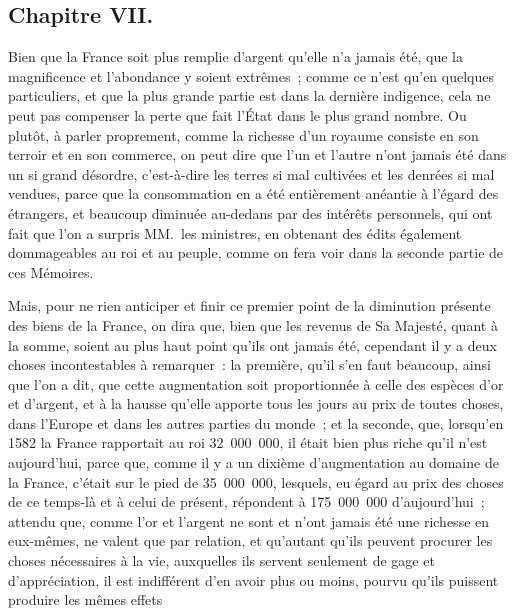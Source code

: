 \documentclass[french,twoside]{book} %
\begin{document}
\subsection[{Chapitre VII.}]{Chapitre VII.}
\noindent Bien que la France soit plus remplie d’argent qu’elle n’a jamais été, que la magnificence et l’abondance y soient extrêmes ; comme ce n’est qu’en quelques particuliers, et que la plus grande partie est dans la dernière indigence, cela ne peut pas compenser la perte que fait l’État dans le plus grand nombre. Ou plutôt, à parler proprement, comme la richesse d’un royaume consiste en son terroir et en son commerce, on peut dire que l’un et l’autre n’ont jamais été dans un si grand désordre, c’est-à-dire les terres si mal cultivées et les denrées si mal vendues, parce que la consommation en a été entièrement anéantie à l’égard des étrangers, et beaucoup diminuée au-dedans par des intérêts personnels, qui ont fait que l’on a surpris MM. les ministres, en obtenant des édits également dommageables au roi et au peuple, comme on fera voir dans la seconde partie de ces Mémoires.\par
Mais, pour ne rien anticiper et finir ce premier point de la diminution présente des biens de la France, on dira que, bien que les revenus de Sa Majesté, quant à la somme, soient au plus haut point qu’ils ont jamais été, cependant il y a deux choses incontestables à remarquer : la première, qu’il s’en faut beaucoup, ainsi que l’on a dit, que cette augmentation soit proportionnée à celle des espèces d’or et d’argent, et à la hausse qu’elle apporte tous les jours au prix de toutes choses, dans l’Europe et dans les autres parties du monde ; et la seconde, que, lorsqu’en 1582 la France rapportait au roi 32 000 000, il était bien plus riche qu’il n’est aujourd’hui, parce que, comme il y a un dixième d’augmentation au domaine de la France, c’était sur le pied de 35 000 000, lesquels, eu égard au prix des choses de ce temps-là et à celui de présent, répondent à 175 000 000 d’aujourd’hui ; attendu que, comme l’or et l’argent ne sont et n’ont jamais été une richesse en eux-mêmes, ne valent que par relation, et qu’autant qu’ils peuvent procurer les choses nécessaires à la vie, auxquelles ils servent seulement de gage et d’appréciation, il est indifférent d’en avoir plus ou moins, pourvu qu’ils puissent produire les mêmes effets\par
\end{document}
